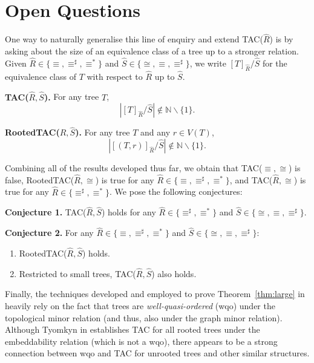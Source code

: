 \documentclass[12pt]{amsart}
\numberwithin{mytheorem}{section} %
\numberwithin{mylemma}{section} %
\numberwithin{mycorollary}{section} %
\newcommand{\N}{\mathbb{N}}
\begin{document}
\section{Open Questions}
One way to naturally generalise this line of enquiry and extend TAC($\hat{R}$) is by asking about the size of an equivalence class of a tree up to a stronger relation. Given $\hat{R} \in \{\equiv, \equiv^\sharp, \equiv^*\}$ and $\hat{S} \in \{\cong, \equiv, \equiv^\sharp\}$, we write $[T]_{\hat{R}}/ \hat{S}$ for the equivalence class of $T$ with respect to $\hat{R}$ up to $\hat{S}$.

\vspace{0.2cm}
\noindent
\textbf{TAC($\hat{R},\hat{S}$).} For any tree $T$,
$$|[T]_{\hat{R}}/ \hat{S}| \notin \N\smallsetminus \{1\}.$$

\vspace{0.2cm}
\noindent
\textbf{RootedTAC($\hat{R},\hat{S}$).} For any tree $T$ and any $r\in V(T)$,
$$|[(T,r)]_{\hat{R}}/ \hat{S}| \notin \N\smallsetminus \{1\}.$$

\vspace{0.2cm}
Combining all of the results developed thus far, we obtain that TAC($\equiv,\cong$) is false, RootedTAC($\hat{R},\cong$) is true for any $\hat{R} \in \{\equiv, \equiv^\sharp, \equiv^*\}$, and TAC($\hat{R},\cong$) is true for any $\hat{R} \in \{\equiv^\sharp, \equiv^*\}$. We pose the following conjectures:

\vspace{0.2cm}
\noindent
\textbf{Conjecture 1.} TAC($\hat{R},\hat{S}$) holds for any $\hat{R} \in \{\equiv^\sharp, \equiv^*\}$ and $\hat{S} \in \{\cong, \equiv, \equiv^\sharp\}$.

\vspace{0.2cm}
\noindent
\textbf{Conjecture 2.} For any $\hat{R} \in \{\equiv, \equiv^\sharp, \equiv^*\}$ and $\hat{S} \in \{\cong, \equiv, \equiv^\sharp\}$:
\begin{enumerate}
\item RootedTAC($\hat{R},\hat{S}$) holds.
\item Restricted to small trees, TAC($\hat{R},\hat{S}$) also holds.
\end{enumerate}

Finally, the techniques developed and employed to prove Theorem~\ref{thm:large} in \cite{BP1} heavily rely on the fact that trees are \textit{well-quasi-ordered} (wqo) under the topological minor relation (and thus, also under the graph minor relation). Although Tyomkyn in \cite{T} establishes TAC for all rooted trees under the embeddability relation (which is not a wqo), there appears to be a strong connection between wqo and TAC for unrooted trees and other similar structures.
\end{document}
